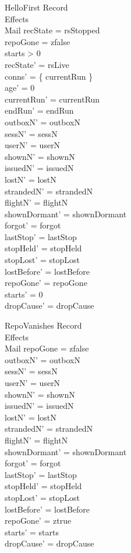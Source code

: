 \documentclass[a4paper,10pt,fleqn]{article}
\begin{document}
\begin{schema}{HelloFirst}
  \Delta Record \\
  \Xi Effects \\
  \Delta Mail
  \where
  recState = rsStopped \\
  repoGone = zfalse \\
  starts > 0 \\
  recState' = rsLive \\
  conns' = \{ currentRun \} \\
  age' = 0 \\
  currentRun' = currentRun \\
  endRun' = endRun \\
  outboxN' = outboxN \\
  sessN' = sessN \\
  userN' = userN \\
  shownN' = shownN \\
  issuedN' = issuedN \\
  lostN' = lostN \\
  strandedN' = strandedN \\
  flightN' = flightN \\
  shownDormant' = shownDormant \\
  forgot' = forgot \\
  lastStop' = lastStop \\
  stopHeld' = stopHeld \\
  stopLost' = stopLost \\
  lostBefore' = lostBefore \\
  repoGone' = repoGone \\
  starts' = 0 \\
  dropCause' = dropCause
\end{schema}

\begin{schema}{RepoVanishes}
  \Xi Record \\
  \Xi Effects \\
  \Delta Mail
  \where
  repoGone = zfalse \\
  outboxN' = outboxN \\
  sessN' = sessN \\
  userN' = userN \\
  shownN' = shownN \\
  issuedN' = issuedN \\
  lostN' = lostN \\
  strandedN' = strandedN \\
  flightN' = flightN \\
  shownDormant' = shownDormant \\
  forgot' = forgot \\
  lastStop' = lastStop \\
  stopHeld' = stopHeld \\
  stopLost' = stopLost \\
  lostBefore' = lostBefore \\
  repoGone' = ztrue \\
  starts' = starts \\
  dropCause' = dropCause
\end{schema}
\end{document}
